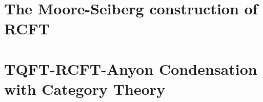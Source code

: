 \chapter{The Moore-Seiberg construction of RCFT}


\chapter{TQFT-RCFT-Anyon Condensation with Category Theory}
